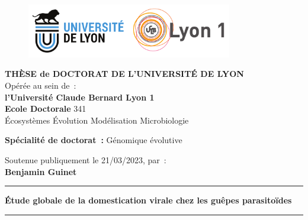 \thispagestyle{empty}

\unitlength 1cm
\begin{center}

    \vspace*{-2.5cm}
    \begin{figure}[h]
        \centering
        \includegraphics[width=0.8\textwidth]{figures/logo-UdL-UCB}
    \end{figure}

    {\large \textbf{THÈSE de DOCTORAT DE L'UNIVERSITÉ DE LYON}\\}
    {Opérée au sein de~:\\}
    {\large \textbf{l'Université Claude Bernard Lyon 1}\\}
    \vspace{12pt}
    {\large \textbf{Ecole Doctorale} 341 \\
    \vspace{0.15cm}
    Écosystèmes Évolution Modélisation Microbiologie
    }
    
    \vspace{12pt}

    {\large \textbf{Spécialité de doctorat~:} Génomique évolutive
    \\}

    \vspace{0.8cm}

    {Soutenue publiquement le 21/03/2023, par~:\\}
    \vspace{0.15cm}
    {\Large \textbf{Benjamin Guinet}}
    \vspace{0.5cm}

    \rule{5cm}{1pt}
    \vspace{12pt}

    {\huge \textbf{Étude globale de la domestication virale chez les guêpes parasitoïdes}\par}

    \vspace{12pt}
    \rule{5cm}{1pt}

    \vspace{0.5cm}

\end{center}

